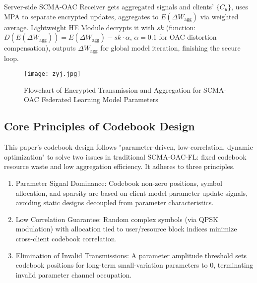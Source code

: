 \documentclass[runningheads]{llncs}
\begin{document}
Server-side SCMA-OAC Receiver gets aggregated signals and clients’ \(\{C_u\}\), uses MPA to separate encrypted updates, aggregates to \(E(\Delta W_{\text{agg}})\) via weighted average. Lightweight HE Module decrypts it with \(sk\) (function: \(D(E(\Delta W_{\text{agg}})) = E(\Delta W_{\text{agg}}) - sk \cdot \alpha\), \(\alpha=0.1\) for OAC distortion compensation), outputs \(\Delta W_{\text{agg}}\) for global model iteration, finishing the secure loop.

\begin{figure}
\centering
\texttt{[image: zyj.jpg]}
\caption{Flowchart of Encrypted Transmission and Aggregation for SCMA-OAC Federated Learning Model Parameters} \label{fig1}
\end{figure}
\subsection{Core Principles of Codebook Design}
This paper’s codebook design follows "parameter-driven, low-correlation, dynamic optimization" to solve two issues in traditional SCMA-OAC-FL: fixed codebook resource waste and low aggregation efficiency. It adheres to three principles.
\begin{enumerate}
\item Parameter Signal Dominance: Codebook non-zero positions, symbol allocation, and sparsity are based on client model parameter update signals, avoiding static designs decoupled from parameter characteristics.
\item Low Correlation Guarantee: Random complex symbols (via QPSK modulation) with allocation tied to user/resource block indices minimize cross-client codebook correlation.
\item Elimination of Invalid Transmissions: A parameter amplitude threshold sets codebook positions for long-term small-variation parameters to 0, terminating invalid parameter channel occupation.
\end{enumerate}
\end{document}
